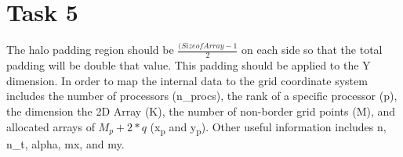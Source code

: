 \documentclass{article}
\begin{document}
\maketitle
\section*{Task 5}

The halo padding region should be $\frac{(Size of Array - 1}{2}$ on each side so that the total padding will be double that value. This padding should be applied to the Y dimension. In order to map the internal data to the grid coordinate system includes the number of processors (n\_procs), the rank of a specific processor (p), the dimension the 2D Array (K), the number of non-border grid points (M), and allocated arrays of $M_p + 2*q$ (x\textsubscript{p} and y\textsubscript{p}). Other useful information includes n, n\_t, alpha, mx, and my. 
\end{document}
